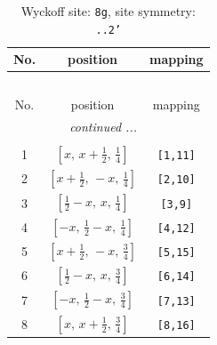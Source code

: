 \documentclass[fleqn,8pt]{jsarticle}
\begin{document}
\renewcommand{\arraystretch}{1.2}
\begin{longtable}{ccc}
\caption{Wyckoff site: {\tt 8g}, site symmetry: {\tt ..2'}}
 \\
 \hline \hline
No. & position & mapping \\ \hline \endfirsthead

\multicolumn{2}{l}{\tablename\ \thetable{}} \\
 \hline \hline
No. & position & mapping \\ \hline \endhead

 \hline \hline
\multicolumn{2}{r}{\footnotesize\it continued ...} \\ \endfoot

 \hline \hline
\multicolumn{2}{r}{} \\ \endlastfoot

1 & $\left[ x,\, x + \frac{1}{2},\, \frac{1}{4} \right]$ & {\tt [1,11]} \\ \hline
2 & $\left[ x + \frac{1}{2},\, - x,\, \frac{1}{4} \right]$ & {\tt [2,10]} \\ \hline
3 & $\left[ \frac{1}{2} - x,\, x,\, \frac{1}{4} \right]$ & {\tt [3,9]} \\ \hline
4 & $\left[ - x,\, \frac{1}{2} - x,\, \frac{1}{4} \right]$ & {\tt [4,12]} \\ \hline
5 & $\left[ x + \frac{1}{2},\, - x,\, \frac{3}{4} \right]$ & {\tt [5,15]} \\ \hline
6 & $\left[ \frac{1}{2} - x,\, x,\, \frac{3}{4} \right]$ & {\tt [6,14]} \\ \hline
7 & $\left[ - x,\, \frac{1}{2} - x,\, \frac{3}{4} \right]$ & {\tt [7,13]} \\ \hline
8 & $\left[ x,\, x + \frac{1}{2},\, \frac{3}{4} \right]$ & {\tt [8,16]} \\
\end{longtable}
\renewcommand{\arraystretch}{1.2}
\end{document}
